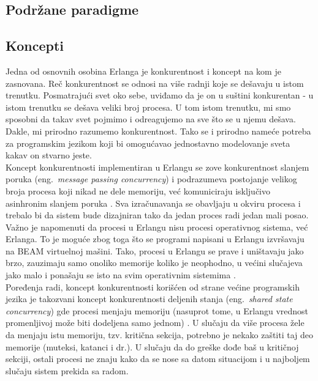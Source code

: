 \documentclass[a4paper]{article}
\begin{document}
{\subsection{Podržane paradigme}
\label{subsec:paradigme}


\subsection{Koncepti}
\label{subsec:koncepti}

Jedna od osnovnih osobina Erlanga je konkurentnost i koncept na kom je zasnovana.
Reč konkurentnost se odnosi na više radnji koje se dešavaju u istom trenutku. Posmatrajući svet oko
sebe, uviđamo da je on u suštini konkurentan - u istom trenutku se dešava veliki broj procesa. \cite{phdthesis}
U tom istom trenutku, mi smo sposobni da takav svet pojmimo i odreagujemo na sve što se u njemu dešava. Dakle, mi prirodno razumemo konkurentnost.
Tako se i prirodno nameće potreba za programskim jezikom koji bi omogućavao jednostavno modelovanje sveta kakav on stvarno jeste. \\

Koncept konkurentnosti implementiran u Erlangu se zove konkurentnost slanjem poruka (eng.~{\em message passing concurrency})
i podrazumeva postojanje velikog broja procesa koji nikad ne dele memoriju, već komuniciraju isključivo asinhronim slanjem poruka \cite{book_joe}.
Sva izračunavanja se obavljaju u okviru procesa i trebalo bi da sistem bude dizajniran tako da jedan proces radi jedan mali posao.
Važno je napomenuti da procesi u Erlangu nisu procesi operativnog sistema, već Erlanga.
To je moguće zbog toga što se programi napisani u Erlangu izvršavaju na BEAM virtuelnoj mašini.
Tako, procesi u Erlangu se prave i uništavaju jako brzo, zauzimaju samo onoliko memorije koliko je neophodno, u većini slučajeva jako malo
i ponašaju se isto na svim operativnim sistemima \cite{book_joe}.
\\

Poređenja radi, koncept konkurentnosti korišćen od strane većine programskih jezika je takozvani 
koncept konkurentnosti deljenih stanja (eng.~{\em shared state concurrency}) gde procesi 
menjaju memoriju (nasuprot tome, u Erlangu vrednost promenljivoj može biti dodeljena samo jednom) \cite{book_joe}. 
U slučaju da više procesa žele da menjaju istu memoriju, tzv. kritična sekcija, potrebno je 
nekako zaštiti taj deo memorije (muteksi, katanci i dr.). U slučaju da do greške dođe baš u kritičnoj sekciji,
ostali procesi ne znaju kako da se nose sa datom situacijom i u najboljem slučaju sistem prekida sa radom. 

}
\end{document}
